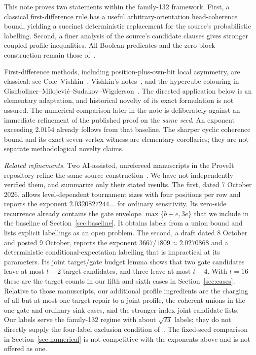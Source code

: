 \documentclass[11pt]{amsart}
\theoremstyle{definition}
\theoremstyle{remark}
\begin{document}
This note proves two statements within the family-132 framework.
First, a classical first-difference rule has a useful arbitrary-orientation
head-coherence bound, yielding a succinct deterministic replacement for the
source's probabilistic labelling. Second, a finer analysis of the source's
candidate clauses gives stronger coupled profile inequalities. All Boolean
predicates and the zero-block construction remain those of~\cite{OpenAI132}.

First-difference methods, including position-plus-own-bit local asymmetry,
are classical: see Cole--Vishkin~\cite{ColeVishkin}, Vishkin's
notes~\cite{VishkinNotes}, and the hypercube colouring in
Gishboliner--Milojevi\'c--Sudakov--Wigderson~\cite{GMSW}.
The directed application below is an elementary adaptation, and historical
novelty of its exact formulation is not assured. The numerical comparison
later in the note is deliberately against an immediate refinement of the
published proof on the \emph{same seed}. An exponent exceeding $2.0154$
already follows from that baseline.
The sharper cyclic coherence bound and its exact seven-vertex witness are
elementary corollaries; they are not separate methodological novelty claims.

\emph{Related refinements.} Two AI-assisted, unrefereed manuscripts in the
ProveIt repository refine the same source construction~\cite{ProveItI,ProveItII}.
We have not independently verified them, and summarize only their stated
results. The first, dated 7 October 2026, allows level-dependent tournament
sizes with four positions per row and reports the exponent
$2.0320827244\ldots$ for ordinary sensitivity. Its zero-side recurrence already contains the
gate envelope $\max\{b+e,3e\}$ that we include in the baseline of
Section~\ref{sec:baseline}. It obtains labels from a union bound and lists
explicit labellings as an open problem. The second, a draft dated 8 October
and posted 9 October, reports the exponent $3667/1809\approx2.0270868$ and a
deterministic conditional-expectation labelling that is impractical at its
parameters. Its joint target/gate budget lemma shows that two gate
candidates leave at most $t-2$ target candidates, and three leave at most
$t-4$. With $t=16$ these are the target counts in our fifth and sixth cases
in Section~\ref{sec:cases}. Relative to those manuscripts, our additional profile
ingredients are the charging of all but at most one target repair to a
joint profile, the coherent unions in the one-gate and ordinary-sink cases,
and the stronger-index joint candidate lists. Our labels serve the
family-132 regime with about $\sqrt M$ labels; they do not directly supply
the four-label exclusion condition of~\cite{ProveItI}. The fixed-seed
comparison in Section~\ref{sec:numerical} is not competitive with the
exponents above and is not offered as one.
\end{document}
